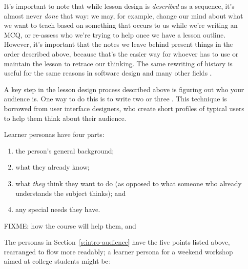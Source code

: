 It's important to note that while lesson design is \emph{described} as a
sequence, it's almost never \emph{done} that way: we may, for example,
change our mind about what we want to teach based on something that
occurs to us while we're writing an MCQ, or re-assess who we're trying
to help once we have a lesson outline. However, it's important that
the notes we leave behind present things in the order described above,
because that's the easier way for whoever has to use or maintain the
lesson to retrace our thinking. The same rewriting of history is
useful for the same reasons in software design and many other fields
\cite{Parn1986}.


A key step in the lesson design process described above is figuring
out who your audience is. One way to do this is to write two or three
. This technique is
borrowed from user interface designers, who create short profiles of
typical users to help them think about their audience.

Learner personas have four parts:

\begin{enumerate}
\item
  the person's general background;
\item
  what they already know;
\item
  what \emph{they} think they want to do (as opposed to what someone who already
  understands the subject thinks); and
\item
  any special needs they have.
\end{enumerate}

FIXME: how the course will help them, and

The personas in Section~\ref{s:intro-audience} have the five points listed above,
rearranged to flow more readably; a learner persona for a weekend workshop aimed
at college students might be:

